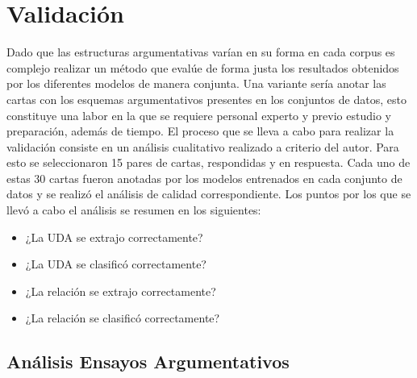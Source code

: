 \section{Validación}

Dado que las estructuras argumentativas varían en su forma en cada corpus es complejo realizar un método que evalúe de forma 
justa los resultados obtenidos por los diferentes modelos de manera conjunta. Una variante sería anotar las cartas 
con los esquemas argumentativos presentes en los conjuntos de datos, esto constituye una labor en la que se requiere
personal experto y previo estudio y preparación, además de tiempo. El proceso que se lleva a cabo para realizar la 
validación consiste en un análisis cualitativo realizado a criterio del autor. Para esto se seleccionaron 15 pares 
de cartas, respondidas y en respuesta. Cada uno de estas 30 cartas fueron anotadas por los modelos entrenados en cada 
conjunto de datos y se realizó el análisis de calidad correspondiente. Los puntos por los que se llevó a cabo el análisis
se resumen en los siguientes:

\begin{itemize}
	\item ¿La UDA se extrajo correctamente?
	\item ¿La UDA se clasificó correctamente?
	\item ¿La relación se extrajo correctamente?
	\item ¿La relación se clasificó correctamente?
\end{itemize}


\subsection{Análisis Ensayos Argumentativos}


